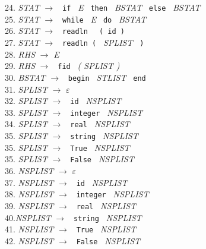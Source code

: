 \documentclass[a4paper, 11pt]{article}
\begin{document}
24. \textit{STAT} $\rightarrow$ \texttt{ if } \textit{E} \texttt{ then } \textit{BSTAT} \texttt{ else } \textit{BSTAT}\\
25. \textit{STAT} $\rightarrow$ \texttt{ while } \textit{E} \texttt{ do } \textit{BSTAT}\\
26. \textit{STAT} $\rightarrow$ \texttt{ readln } \texttt{ ( id ) }\\
27. \textit{STAT} $\rightarrow$ \texttt{ readln ( } \textit{SPLIST } \texttt{ )}\\
28. \textit{RHS} $\rightarrow$ \textit{E}\\
29. \textit{RHS} $\rightarrow$ \texttt{ fid } \textit{ ( SPLIST ) }\\
30. \textit{BSTAT} $\rightarrow$ \texttt{ begin } \textit{STLIST} \texttt{ end }\\
31. \textit{SPLIST} $\rightarrow$ $\varepsilon$\\
32. \textit{SPLIST} $\rightarrow$ \texttt{ id } \textit{NSPLIST}\\
33. \textit{SPLIST} $\rightarrow$ \texttt{ integer } \textit{NSPLIST}\\
34. \textit{SPLIST} $\rightarrow$ \texttt{ real } \textit{NSPLIST}\\
35. \textit{SPLIST} $\rightarrow$ \texttt{ string } \textit{NSPLIST}\\
35. \textit{SPLIST} $\rightarrow$ \texttt{ True } \textit{NSPLIST}\\
35. \textit{SPLIST} $\rightarrow$ \texttt{ False } \textit{NSPLIST}\\
36. \textit{NSPLIST} $\rightarrow$ $\varepsilon$\\
37. \textit{NSPLIST} $\rightarrow$ \texttt{ id } \textit{NSPLIST}\\
38. \textit{NSPLIST} $\rightarrow$ \texttt{ integer } \textit{NSPLIST}\\
39. \textit{NSPLIST} $\rightarrow$ \texttt{ real } \textit{NSPLIST}\\
40.\textit{NSPLIST} $\rightarrow$ \texttt{ string } \textit{NSPLIST}\\
41. \textit{NSPLIST} $\rightarrow$ \texttt{ True } \textit{NSPLIST}\\
42. \textit{NSPLIST} $\rightarrow$ \texttt{ False } \textit{NSPLIST}\\
\newpage
\end{document}
